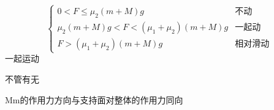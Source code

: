 \[
\left\{\begin{array}{ll}
0<F\le\mu_2(m+M)g & \text{不动}\\
\mu_2(m+M)g<F<(\mu_1+\mu_2)(m+M)g & \text{一起动}\\
F>(\mu_1+\mu_2)(m+M)g & \text{相对滑动}
\end{array}\right.
\]
一起运动


不管有无\unclear{$\mu$}


Mm的作用力方向与支持面对整体的作用力同向 %

